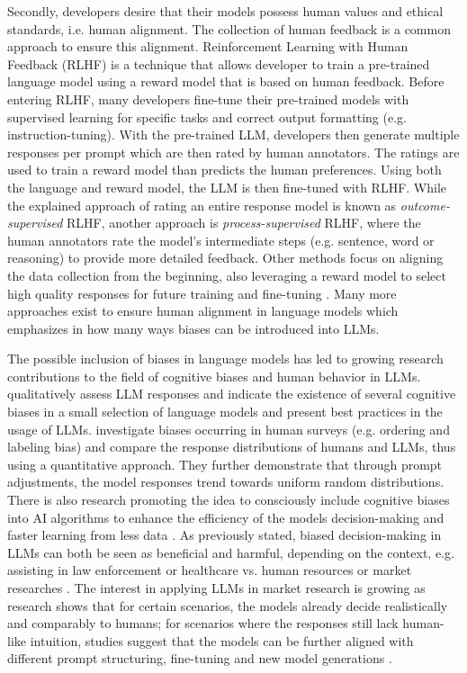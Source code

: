 \par Secondly, developers desire that their models possess human values and ethical standards, i.e. human alignment. The collection of human feedback is a common approach to ensure this alignment. Reinforcement Learning with Human Feedback (RLHF) is a technique that allows developer to train a pre-trained language model using a reward model that is based on human feedback. Before entering RLHF, many developers fine-tune their pre-trained models with supervised learning for specific tasks and correct output formatting (e.g. instruction-tuning). With the pre-trained LLM, developers then generate multiple responses per prompt which are then rated by human annotators. The ratings are used to train a reward model than predicts the human preferences. Using both the language and reward model, the LLM is then fine-tuned with RLHF. While the explained approach of rating an entire response model is known as \textit{outcome-supervised} RLHF, another approach is \textit{process-supervised} RLHF, where the human annotators rate the model's intermediate steps (e.g. sentence, word or reasoning) to provide more detailed feedback. Other methods focus on aligning the data collection from the beginning, also leveraging a reward model to select high quality responses for future training and fine-tuning \parencite{ouyang2022training, zhao2023survey}. Many more approaches exist to ensure human alignment in language models which emphasizes in how many ways biases can be introduced into LLMs.

\par The possible inclusion of biases in language models has led to growing research contributions to the field of cognitive biases and human behavior in LLMs. \textcite{talboy2023challenging} qualitatively assess LLM responses and indicate the existence of several cognitive biases in a small selection of language models and present best practices in the usage of LLMs. \textcite{dominguez2023questioning} investigate biases occurring in human surveys (e.g. ordering and labeling bias) and compare the response distributions of humans and LLMs, thus using a quantitative approach. They further demonstrate that through prompt adjustments, the model responses trend towards uniform random distributions. There is also research promoting the idea to consciously include cognitive biases into AI algorithms to enhance the efficiency of the models decision-making and faster learning from less data \parencite{hagendorff2024we, taniguchi2018machine}. As previously stated, biased decision-making in LLMs can both be seen as beneficial and harmful, depending on the context, e.g. assisting in law enforcement or healthcare vs. human resources or market researches \parencite{zhao2023survey}. The interest in applying LLMs in market research is growing as research shows that for certain scenarios, the models already decide realistically and comparably to humans; for scenarios where the responses still lack human-like intuition, studies suggest that the models can be further aligned with different prompt structuring, fine-tuning and new model generations \parencite{brand2023using, qiu2023much}.